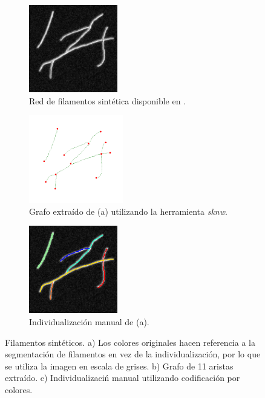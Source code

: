  \begin{figure}[h!]
    \centering
    \begin{subfigure}[t]{0.3\textwidth}
        \centering
        \includegraphics[height=1.5in]{benchImages/Synth-QuantitativeIFS-Fig7_gray.png}
        \caption{Red de filamentos sint\'etica disponible en \citet{qiu2014quantitative}.}
        \label{fig:synth-QFS-7-original}
    \end{subfigure}%
    \hspace{0.5cm}
    \begin{subfigure}[t]{0.3\textwidth}
        \centering
        \includegraphics[height=1.5in]{benchImages/Synth-QuantitativeIFS-Fig7_graph_labeled_thick.png}
        \caption{Grafo extra\'ido de (a) utilizando la herramienta {\it sknw}.}
        \label{fig:synth-QFS-7-graph}
    \end{subfigure}
    \hspace{0.5cm}
    \begin{subfigure}[t]{0.3\textwidth}
        \centering
        \includegraphics[height=1.5in]{benchImages/Synth-QuantitativeIFS-Fig7_groundTruth.png}
        \caption{Individualizaci\'on manual de (a).}
        \label{fig:synth-QFS-7-gt}
    \end{subfigure}
    \caption[Filamentos sint\'eticos a evaluar con el algoritmo propuesto.]{Filamentos sint\'eticos. a) Los colores originales hacen referencia a la segmentaci\'on de filamentos en vez de la individualizaci\'on, por lo que se utiliza la imagen en escala de grises. b) Grafo de 11 aristas extra\'ido. c) Individualizaci\'n manual utilizando codificaci\'on por colores.}
    \label{fig:synth-QFS-7}
\end{figure}


